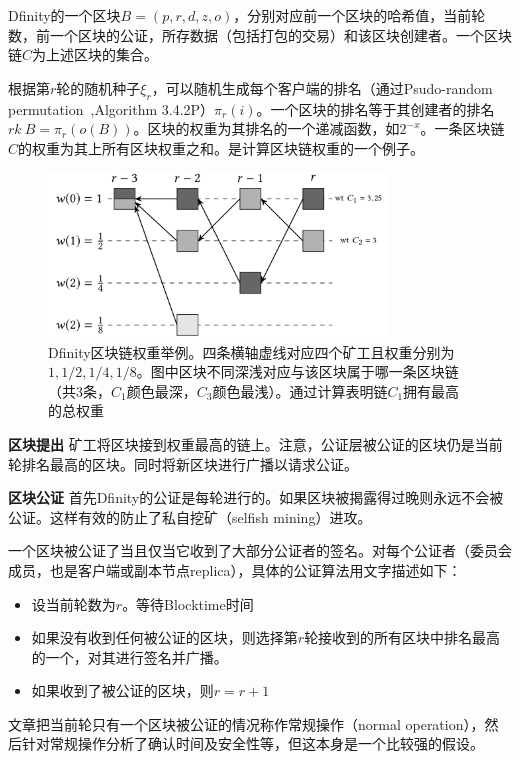 Dfinity的一个区块$B=(p,r,d,z,o)$，分别对应前一个区块的哈希值，当前轮数，前一个区块的公证，所存数据（包括打包的交易）和该区块创建者。一个区块链$C$为上述区块的集合。

根据第$r$轮的随机种子$\xi_r$，可以随机生成每个客户端的排名（通过Psudo-random permutation~\cite{knuth1997art},Algorithm 3.4.2P）$\pi_r(i)$。一个区块的排名等于其创建者的排名$rk\ B=\pi_r(o (B))$。区块的权重为其排名的一个递减函数，如$2^{-x}$。一条区块链$C$的权重为其上所有区块权重之和。是计算区块链权重的一个例子。

\begin{figure}
	\centering
	\includegraphics[width=0.8\textwidth]{../common/Dfinity_1.png}
	\caption{Dfinity区块链权重举例。四条横轴虚线对应四个矿工且权重分别为$1,1/2,1/4,1/8$。图中区块不同深浅对应与该区块属于哪一条区块链（共3条，$C_1$颜色最深，$C_3$颜色最浅）。通过计算表明链$C_1$拥有最高的总权重} 		
	\label{fig:Dfinity1}
\end{figure}
\textbf{区块提出}
矿工将区块接到权重最高的链上。注意，公证层被公证的区块仍是当前轮排名最高的区块。同时将新区块进行广播以请求公证。

\textbf{区块公证}
首先Dfinity的公证是每轮进行的。如果区块被揭露得过晚则永远不会被公证。这样有效的防止了私自挖矿（selfish mining）进攻。

一个区块被公证了当且仅当它收到了大部分公证者的签名。对每个公证者（委员会成员，也是客户端或副本节点replica），具体的公证算法用文字描述如下：
\begin{itemize}
	\item 设当前轮数为$r$。等待Blocktime时间
	\item 如果没有收到任何被公证的区块，则选择第$r$轮接收到的所有区块中排名最高的一个，对其进行签名并广播。
	\item 如果收到了被公证的区块，则$r=r+1$
\end{itemize}
文章把当前轮只有一个区块被公证的情况称作常规操作（normal operation），然后针对常规操作分析了确认时间及安全性等，但这本身是一个比较强的假设。

